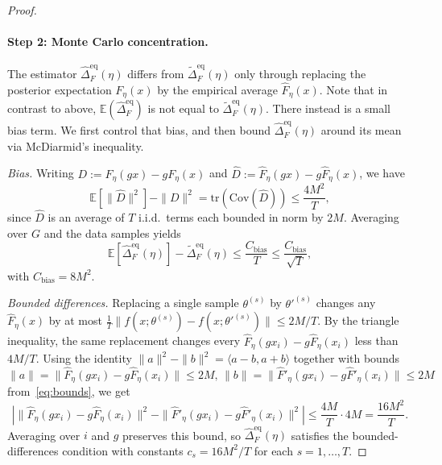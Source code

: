 \documentclass{article}
\begin{document}
\begin{proof}
    \paragraph{Step 2: Monte Carlo concentration.} The estimator $\widehat{\Delta}^{\mathrm{eq}}_{F}(\eta)$ differs from $\widetilde{\Delta}^{\mathrm{eq}}_{F}(\eta)$ only through replacing the posterior expectation $F_{\eta}(x)$ by the empirical average $\widehat{F}_{\eta}(x)$. Note that in contrast to above, $\mathbb{E}(\widehat{\Delta}_F^{\mathrm{eq}})$ is not equal to $\widetilde{\Delta}_F^{\mathrm{eq}}(\eta)$. There instead is a small bias term. We first control that bias, and then  bound $\widehat{\Delta}^{\mathrm{eq}}_{F}(\eta)$ around its mean via McDiarmid's inequality.

    \emph{Bias.} Writing $D := F_{\eta}(gx) - g F_{\eta}(x)$ and $\widehat{D} := \widehat{F}_{\eta}(gx) - g \widehat{F}_{\eta}(x)$, we have
    \begin{equation}
        \mathbb{E}\!\left[\|\widehat{D}\|^{2}\right] - \|D\|^{2} = \mathrm{tr}\!\left(\mathrm{Cov}(\widehat{D})\right) \le \frac{4 M^{2}}{T},
    \end{equation}
    since $\widehat{D}$ is an average of $T$ i.i.d.\ terms each bounded in norm by $2M$. Averaging over $G$ and the data samples yields
    \begin{equation} \label{eq:bias}
        \mathbb{E}[\widehat{\Delta}^{\mathrm{eq}}_{F}(\eta)] - \widetilde{\Delta}^{\mathrm{eq}}_{F}(\eta) \le \frac{C_{\mathrm{bias}}}{T}\leq \frac{C_{\mathrm{bias}}}{\sqrt{T}},
    \end{equation}
    with $C_{\mathrm{bias}} = 8 M^{2}$. 
    
    \emph{Bounded differences.} Replacing a single sample $\theta^{(s)}$ by $\theta'^{(s)}$ changes any $\widehat{F}_{\eta}(x)$ by at most $\frac{1}{T}\|f(x;\theta^{(s)}) - f(x;\theta'^{(s)})\| \le 2M/T$. By the triangle inequality, the same replacement changes every $\widehat{F}_{\eta}(gx_{i}) - g \widehat{F}_{\eta}(x_{i})$ less than $4M/T$. Using the identity $\|a\|^{2} - \|b\|^{2} = \langle a-b, a+b\rangle$ together with bounds $\|a\| = \|\widehat{F}_\eta(gx_{i}) - g\widehat{F}_\eta(x_{i})\| \le 2M,\, \|b\| = \|\widehat{F}'_\eta(gx_{i}) - g\widehat{F}'_\eta(x_{i})\| \le 2M$ from~\eqref{eq:bounds}, we get
    \begin{equation}
        \left|\|\widehat{F}_{\eta}(gx_{i}) - g \widehat{F}_{\eta}(x_{i})\|^{2} - \|\widehat{F}'_{\eta}(gx_{i}) - g \widehat{F}'_{\eta}(x_{i})\|^{2}\right| \le \frac{4M}{T} \cdot 4M = \frac{16 M^{2}}{T}.
    \end{equation}
    Averaging over $i$ and $g$ preserves this bound, so $\widehat{\Delta}^{\mathrm{eq}}_{F}(\eta)$ satisfies the bounded-differences condition with constants $c_{s} = 16 M^{2}/T$ for each $s = 1, \ldots, T$. 
    

\end{proof}
\end{document}
